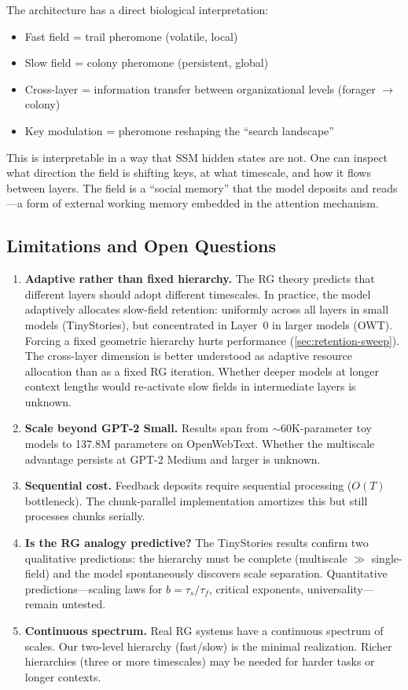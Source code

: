 \documentclass[11pt,a4paper]{article}
\begin{document}
The architecture has a direct biological interpretation:
\begin{itemize}
  \item Fast field = trail pheromone (volatile, local)
  \item Slow field = colony pheromone (persistent, global)
  \item Cross-layer = information transfer between organizational
    levels (forager $\to$ colony)
  \item Key modulation = pheromone reshaping the ``search landscape''
\end{itemize}

This is interpretable in a way that SSM hidden states are not.  One
can inspect what direction the field is shifting keys, at what
timescale, and how it flows between layers.  The field is a
``social memory'' that the model deposits and reads---a form of
external working memory embedded in the attention mechanism.

\subsection{Limitations and Open Questions}

\begin{enumerate}
  \item \textbf{Adaptive rather than fixed hierarchy.}
    The RG theory predicts that different layers should adopt
    different timescales.  In practice, the model adaptively
    allocates slow-field retention: uniformly across all layers in
    small models (TinyStories), but concentrated in Layer~0 in larger
    models (OWT).  Forcing a fixed geometric hierarchy hurts
    performance (\cref{sec:retention-sweep}).  The cross-layer
    dimension is better understood as adaptive resource allocation
    than as a fixed RG iteration.  Whether deeper models at longer
    context lengths would re-activate slow fields in intermediate
    layers is unknown.
  \item \textbf{Scale beyond GPT-2 Small.}  Results span from
    $\sim$60K-parameter toy models to 137.8M parameters on
    OpenWebText.  Whether the multiscale advantage persists at
    GPT-2 Medium and larger is unknown.
  \item \textbf{Sequential cost.}  Feedback deposits require
    sequential processing ($O(T)$ bottleneck).  The chunk-parallel
    implementation amortizes this but still processes chunks serially.
  \item \textbf{Is the RG analogy predictive?}  The TinyStories
    results confirm two qualitative predictions: the hierarchy must
    be complete (multiscale $\gg$ single-field) and the model
    spontaneously discovers scale separation.  Quantitative
    predictions---scaling laws for $b = \tau_s/\tau_f$, critical
    exponents, universality---remain untested.
  \item \textbf{Continuous spectrum.}  Real RG systems have a
    continuous spectrum of scales.  Our two-level hierarchy
    (fast/slow) is the minimal realization.  Richer hierarchies
    (three or more timescales) may be needed for harder tasks
    or longer contexts.
\end{enumerate}
\end{document}
